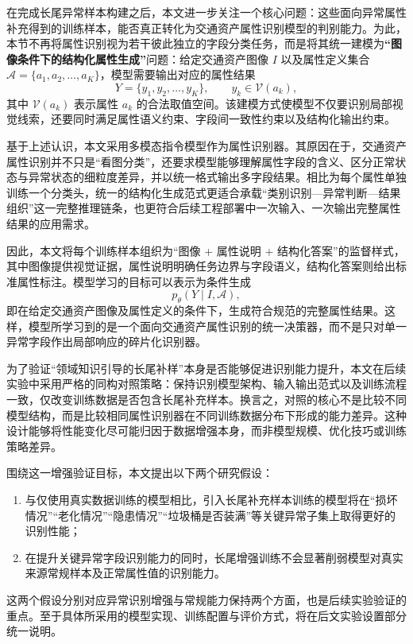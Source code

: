 在完成长尾异常样本构建之后，本文进一步关注一个核心问题：这些面向异常属性补充得到的训练样本，能否真正转化为交通资产属性识别模型的判别能力。为此，本节不再将属性识别视为若干彼此独立的字段分类任务，而是将其统一建模为\textbf{“图像条件下的结构化属性生成”}问题：给定交通资产图像 $I$ 以及属性定义集合 $\mathcal{A}=\{a_1,a_2,\dots,a_K\}$，模型需要输出对应的属性结果
\[
Y=\{y_1,y_2,\dots,y_K\}, \qquad y_k \in \mathcal{V}(a_k),
\]
其中 $\mathcal{V}(a_k)$ 表示属性 $a_k$ 的合法取值空间。该建模方式使模型不仅要识别局部视觉线索，还要同时满足属性语义约束、字段间一致性约束以及结构化输出约束。

基于上述认识，本文采用多模态指令模型作为属性识别器。其原因在于，交通资产属性识别并不只是“看图分类”，还要求模型能够理解属性字段的含义、区分正常状态与异常状态的细粒度差异，并以统一格式输出多字段结果。相比为每个属性单独训练一个分类头，统一的结构化生成范式更适合承载“类别识别—异常判断—结果组织”这一完整推理链条，也更符合后续工程部署中一次输入、一次输出完整属性结果的应用需求。

因此，本文将每个训练样本组织为“图像 + 属性说明 + 结构化答案”的监督样式，其中图像提供视觉证据，属性说明明确任务边界与字段语义，结构化答案则给出标准属性标注。模型学习的目标可以表示为条件生成
\[
p_{\theta}(Y \mid I, \mathcal{A}),
\]
即在给定交通资产图像及属性定义的条件下，生成符合规范的完整属性结果。这样，模型所学习到的是一个面向交通资产属性识别的统一决策器，而不是只对单一异常字段作出局部响应的碎片化识别器。

为了验证“领域知识引导的长尾补样”本身是否能够促进识别能力提升，本文在后续实验中采用严格的同构对照策略：保持识别模型架构、输入输出范式以及训练流程一致，仅改变训练数据是否包含长尾补充样本。换言之，对照的核心不是比较不同模型结构，而是比较相同属性识别器在不同训练数据分布下形成的能力差异。这种设计能够将性能变化尽可能归因于数据增强本身，而非模型规模、优化技巧或训练策略差异。

围绕这一增强验证目标，本文提出以下两个研究假设：
\begin{enumerate}
    \item 与仅使用真实数据训练的模型相比，引入长尾补充样本训练的模型将在“损坏情况”“老化情况”“隐患情况”“垃圾桶是否装满”等关键异常子集上取得更好的识别性能；
    \item 在提升关键异常字段识别能力的同时，长尾增强训练不会显著削弱模型对真实来源常规样本及正常属性值的识别能力。
\end{enumerate}

这两个假设分别对应异常识别增强与常规能力保持两个方面，也是后续实验验证的重点。至于具体所采用的模型实现、训练配置与评价方式，将在后文实验设置部分统一说明。

